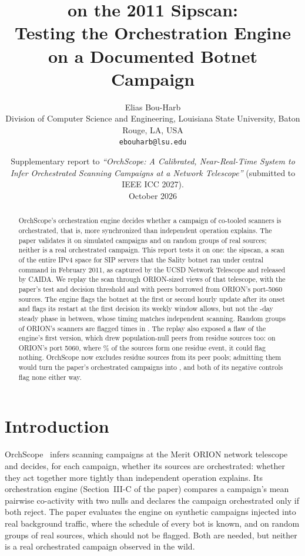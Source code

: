 \documentclass[11pt]{article}
\title{\sysname{} on the 2011 Sipscan:\\Testing the Orchestration Engine on a Documented Botnet
Campaign}
\author{Elias Bou-Harb\\[2pt]
\normalsize Division of Computer Science and Engineering, Louisiana State University,
Baton Rouge, LA, USA\\
\normalsize \texttt{ebouharb@lsu.edu}}
\date{\normalsize Supplementary report to \emph{``OrchScope: A Calibrated, Near-Real-Time System to
Infer Orchestrated Scanning Campaigns at a Network Telescope''} (submitted to IEEE ICC 2027).\\
October 2026}
\newcommand{\sysname}{OrchScope}
\begin{document}
\maketitle

\begin{abstract}
\sysname's orchestration engine decides whether a campaign of co-tooled scanners is
orchestrated, that is, more synchronized than independent operation explains. The paper
validates it on simulated campaigns and on random groups of real sources; neither is a real
orchestrated campaign. This report tests it on one: the sipscan, a scan of the entire IPv4 space
for SIP servers that the Sality botnet ran under central command in February 2011, as captured by
the UCSD Network Telescope and released by CAIDA. We replay the scan through ORION-sized views of
that telescope, with the paper's test and decision threshold and with peers borrowed from ORION's
port-5060 sources. The engine flags the botnet at the first or second hourly update after its
onset and flags its restart at the first decision its weekly window allows, but not the
\SipSteadyDays-day steady phase in between, whose timing matches independent scanning. Random
groups of ORION's scanners are flagged \SipCtlFlag{} times in \SipCtlTotal. The replay also
exposed a flaw of the engine's first version, which drew population-null peers from residue
sources too: on ORION's port 5060, where \OrionResiduePct\% of the sources form one residue event,
it could flag nothing. \sysname{} now excludes residue sources from its peer pools; admitting them
would turn the paper's \WeekOrch{} orchestrated campaigns into \ResPeersOrch, and both of its
negative controls flag none either way.
\end{abstract}

\section{Introduction}

\sysname~\cite{orchscope} infers scanning campaigns at the Merit ORION network
telescope~\cite{ismail2025merit} and decides, for each campaign, whether its sources are
orchestrated: whether they act together more tightly than independent operation explains. Its
orchestration engine (Section~III-C of the paper) compares a campaign's mean pairwise
co-activity with two nulls and declares the campaign orchestrated only if both reject. The paper
evaluates the engine on synthetic campaigns injected into real background traffic, where the
schedule of every bot is known, and on random groups of real sources, which should not be
flagged. Both are needed, but neither is a real orchestrated campaign observed in the wild.
\end{document}
